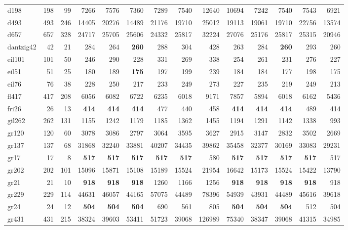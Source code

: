 {\begin{longtable}{l r r r r r r r r r r r r r}
d198 & 198 & 99 & 7266 & 7576 & 7360 & 7289 & 7540 & 12640 & 10694 & 7242 & 7540 & 7543 & 6921 \\
d493 & 493 & 246 & 14405 & 20276 & 14489 & 21176 & 19710 & 25012 & 19113 & 19061 & 19710 & 22756 & 13574 \\
d657 & 657 & 328 & 24717 & 25705 & 25606 & 24332 & 25817 & 32224 & 27076 & 25176 & 25817 & 25315 & 20946 \\
dantzig42 & 42 & 21 & 284 & 264 & \textbf{260} & 288 & 304 & 428 & 263 & 284 & \textbf{260} & 293 & 260 \\
eil101 & 101 & 50 & 246 & 290 & 228 & 331 & 269 & 338 & 254 & 261 & 231 & 276 & 227 \\
eil51 & 51 & 25 & 180 & 189 & \textbf{175} & 197 & 199 & 239 & 184 & 184 & 177 & 198 & 175 \\
eil76 & 76 & 38 & 228 & 250 & 217 & 233 & 249 & 273 & 227 & 235 & 219 & 249 & 213 \\
fl417 & 417 & 208 & 6056 & 6082 & 6722 & 6235 & 6018 & 9171 & 7857 & 5894 & 6018 & 6162 & 5436 \\
fri26 & 26 & 13 & \textbf{414} & \textbf{414} & \textbf{414} & 477 & 440 & 458 & \textbf{414} & \textbf{414} & \textbf{414} & 489 & 414 \\
gil262 & 262 & 131 & 1155 & 1242 & 1179 & 1185 & 1362 & 1455 & 1194 & 1291 & 1142 & 1338 & 993 \\
gr120 & 120 & 60 & 3078 & 3086 & 2797 & 3064 & 3595 & 3627 & 2915 & 3147 & 2832 & 3502 & 2669 \\
gr137 & 137 & 68 & 31868 & 32240 & 33881 & 40207 & 34435 & 39862 & 35458 & 32377 & 30169 & 33083 & 29231 \\
gr17 & 17 & 8 & \textbf{517} & \textbf{517} & \textbf{517} & \textbf{517} & \textbf{517} & 580 & \textbf{517} & \textbf{517} & \textbf{517} & \textbf{517} & 517 \\
gr202 & 202 & 101 & 15096 & 15871 & 15108 & 15189 & 15524 & 21954 & 16642 & 15173 & 15524 & 15422 & 13790 \\
gr21 & 21 & 10 & \textbf{918} & \textbf{918} & \textbf{918} & 1260 & 1166 & 1256 & \textbf{918} & \textbf{918} & \textbf{918} & \textbf{918} & 918 \\
gr229 & 229 & 114 & 44631 & 46057 & 44165 & 57075 & 44489 & 78396 & 54939 & 43931 & 44489 & 45616 & 39618 \\
gr24 & 24 & 12 & \textbf{504} & \textbf{504} & \textbf{504} & 690 & 561 & 805 & \textbf{504} & \textbf{504} & \textbf{504} & 512 & 504 \\
gr431 & 431 & 215 & 38324 & 39603 & 53411 & 51723 & 39068 & 126989 & 75340 & 38347 & 39068 & 41315 & 34985 \\

\end{longtable}}
